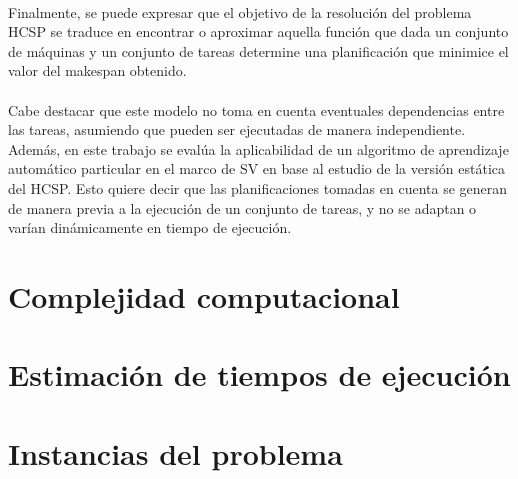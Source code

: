 \paragraph{}Finalmente, se puede expresar que el objetivo de la resolución del problema HCSP se traduce en encontrar o aproximar aquella función que dada un conjunto de máquinas y un conjunto de tareas determine una planificación que minimice el valor del makespan obtenido.

\paragraph{}Cabe destacar que este modelo no toma en cuenta eventuales dependencias entre las tareas, asumiendo que pueden ser ejecutadas de manera independiente. Además, en este trabajo se evalúa la aplicabilidad de un algoritmo de aprendizaje automático particular en el marco de SV en base al estudio de la versión estática del HCSP. Esto quiere decir que las planificaciones tomadas en cuenta se generan de manera previa a la ejecución de un conjunto de tareas, y no se adaptan o varían dinámicamente en tiempo de ejecución.

\section{Complejidad computacional} \label{section:descripcion-problema,subsection:complejidad-computacional}
\section{Estimación de tiempos de ejecución} \label{section:descripcion-problema,subsection:estimacion-tiempo-ejecucion}
\section{Instancias del problema} \label{section:descripcion-problema,subsection:instancias-del-problema}







